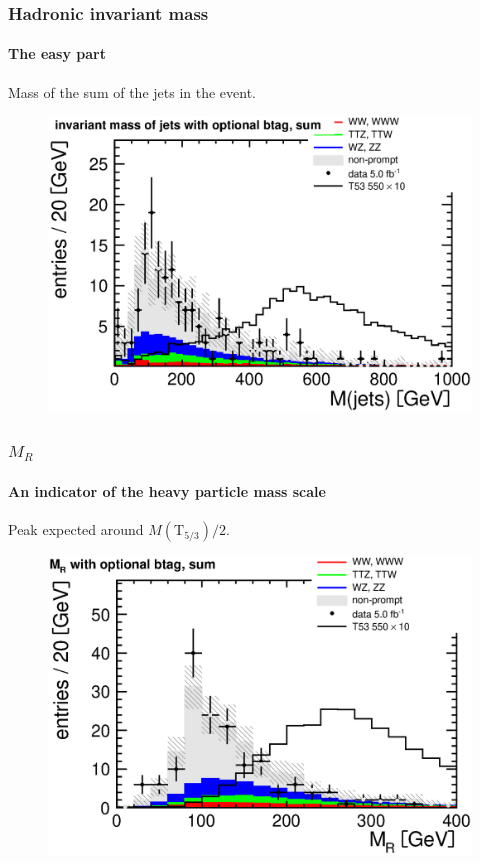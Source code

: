 \documentclass[ukenglish]{beamer}
\begin{document}
\begin{frame}
    \frametitle{Hadronic invariant mass}
    \framesubtitle{The easy part}
    \begin{block}{}
        Mass of the sum of the jets in the event.
    \end{block}
        \begin{figure}[h]
            \centering
            \includegraphics[width=.7\textwidth]{had_mass_optional_btag_sum.eps}
        \end{figure}
\end{frame}

\begin{frame}
    \frametitle{$M_R$}
    \framesubtitle{An indicator of the heavy particle mass scale}
    \begin{block}{}
        Peak expected around $M(\mathrm{T}_{5/3})/2$.
    \end{block}
        \begin{figure}[h]
            \centering
            \includegraphics[width=.7\textwidth]{mr_optional_btag_sum.eps}
        \end{figure}
\end{frame}
\end{document}
